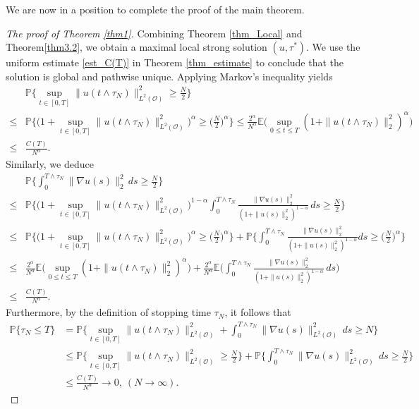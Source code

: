 \documentclass[reqno, 11pt]{amsart}
\theoremstyle{definition}
\numberwithin{equation}{section} \numberwithin{lem}{section}
\numberwithin{thm}{section} \numberwithin{prop}{section}
\numberwithin{cor}{section} \numberwithin{rem}{section}
\numberwithin{defn}{section}
\begin{document}
     We are now in a position to complete the proof of the main theorem.
    \begin{proof}[The proof of Theorem \ref{thm1}] 
Combining Theorem \ref{thm_Local} and Theorem\ref{thm3.2}, we  obtain a maximal local strong solution $(u,\tau^*)$. We use the uniform estimate \eqref{est_C(T)} in Theorem \ref{thm_estimate} to conclude that the solution is global and pathwise unique. Applying  Markov's inequality yields
    \begin{align*}
       & \mathbb{P}\Big\{\sup_{t\in[0,T]}\|u({t\wedge{\tau_N}})\|_{L^2(\mathcal O)}^2\ge \frac{N}{2}\Big\}\\\le& \mathbb{P}\Big\{\Big(1+\sup_{t\in[0,T]}\|u({t\wedge{\tau_N}})\|_{L^2(\mathcal O)}^2\Big)^\alpha\ge \Big(\frac{N}{2}\Big)^\alpha\Big\}\le \frac{2^\alpha}{N^\alpha}\mathbb{E}\Big(\sup_{0\le t\le T}(1+\|u(t\wedge\tau_N)\|_2^2)^\alpha\Big)\\\le& \frac{C(T)}{N^\alpha}.
    \end{align*}
    Similarly, we deduce
    \begin{align*}
    &\mathbb{P}\Big\{\int_0^{T\wedge{\tau_N}}
		\|\nabla u(s)\|_2^2\,ds\ge \frac{N}{2}\Big\}\\\le& 
        \mathbb{P}\Big\{\Big(1+\sup_{t\in[0,T]}\|u({t\wedge{\tau_N}})\|_{L^2(\mathcal O)}^2\Big)^{1-\alpha}\int_0^{T\wedge{\tau_N}}
		\frac{\|\nabla u(s)\|_2^2}{(1+\|u(s)\|_2^2)^{1-\alpha}}\,ds\ge \frac{N}{2}\Big\}\\
        \le&\mathbb{P}\Big\{\Big(1+\sup_{t\in[0,T]}\|u({t\wedge{\tau_N}})\|_{L^2(\mathcal O)}^2\Big)^{\alpha}\ge\Big(\frac{N}{2}\Big)^\alpha\Big\}+\mathbb{P}\Big\{\int_0^{T\wedge{\tau_N}}
		\frac{\|\nabla u(s)\|_2^2}{(1+\|u(s)\|_2^2)^{1-\alpha}}ds\ge \Big(\frac{N}{2}\Big)^\alpha\Big\}\\\le&\frac{2^\alpha}{N^\alpha}\mathbb{E}\Big(\sup_{0\le t\le T}(1+\|u(t\wedge\tau_N)\|_2^2)^\alpha\Big)+\frac{2^\alpha}{N^\alpha}\mathbb{E}\Big(\int_0^{T\wedge{\tau_N}}
		\frac{\|\nabla u(s)\|_2^2}{(1+\|u(s)\|_2^2)^{1-\alpha}}\,ds\Big)\\
        \le&\frac{C(T)}{N^\alpha}.
    \end{align*}
Furthermore, by the definition of stopping time ${\tau_N}$, it follows that
       \begin{align*}
       \nonumber\mathbb{P}\Big\{{\tau_N}\leq T\Big\}&=\mathbb{P}\Big\{\sup_{t\in[0,T]}\|u({t\wedge{\tau_N}})\|_{L^2(\mathcal O)}^2+\int_0^{T\wedge{\tau_N}}\|\nabla u(s)\|_{L^2(\mathcal{O})}^2\,ds\ge N\Big\}\\&\le \mathbb{P}\Big\{\sup_{t\in[0,T]}\|u({t\wedge{\tau_N}})\|_{L^2(\mathcal O)}^2\ge \frac{N}{2}\Big\}+\mathbb{P}\Big\{\int_0^{T\wedge{\tau_N}}\|\nabla u(s)\|_{L^2(\mathcal{O})}^2\,ds\ge\frac {N}{2}\Big\}
\\&\leq \frac{C(T)}{N^\alpha}\to 0,~(N\to \infty).
       \end{align*}
       

\end{proof}
\end{document}

